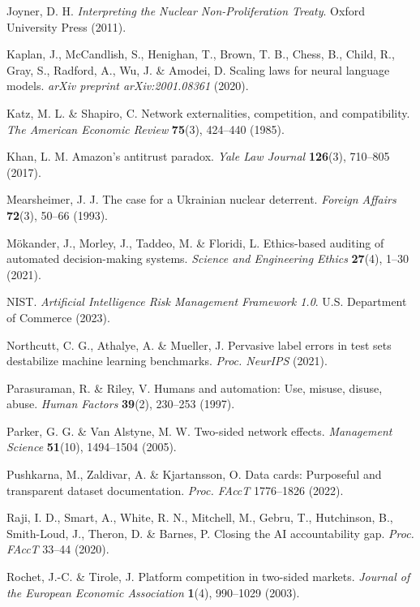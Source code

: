 \documentclass[12pt,a4paper]{article}
\theoremstyle{definition}
\theoremstyle{remark}
\begin{document}
 Joyner, D. H. \textit{Interpreting the Nuclear Non-Proliferation Treaty}. Oxford University Press (2011).

 Kaplan, J., McCandlish, S., Henighan, T., Brown, T. B., Chess, B., Child, R., Gray, S., Radford, A., Wu, J. \& Amodei, D. Scaling laws for neural language models. \textit{arXiv preprint arXiv:2001.08361} (2020).

 Katz, M. L. \& Shapiro, C. Network externalities, competition, and compatibility. \textit{The American Economic Review} \textbf{75}(3), 424--440 (1985).

 Khan, L. M. Amazon's antitrust paradox. \textit{Yale Law Journal} \textbf{126}(3), 710--805 (2017).

 Mearsheimer, J. J. The case for a Ukrainian nuclear deterrent. \textit{Foreign Affairs} \textbf{72}(3), 50--66 (1993).

 M\"{o}kander, J., Morley, J., Taddeo, M. \& Floridi, L. Ethics-based auditing of automated decision-making systems. \textit{Science and Engineering Ethics} \textbf{27}(4), 1--30 (2021).

 NIST. \textit{Artificial Intelligence Risk Management Framework 1.0}. U.S. Department of Commerce (2023).

 Northcutt, C. G., Athalye, A. \& Mueller, J. Pervasive label errors in test sets destabilize machine learning benchmarks. \textit{Proc. NeurIPS} (2021).

 Parasuraman, R. \& Riley, V. Humans and automation: Use, misuse, disuse, abuse. \textit{Human Factors} \textbf{39}(2), 230--253 (1997).

 Parker, G. G. \& Van Alstyne, M. W. Two-sided network effects. \textit{Management Science} \textbf{51}(10), 1494--1504 (2005).

 Pushkarna, M., Zaldivar, A. \& Kjartansson, O. Data cards: Purposeful and transparent dataset documentation. \textit{Proc. FAccT} 1776--1826 (2022).

 Raji, I. D., Smart, A., White, R. N., Mitchell, M., Gebru, T., Hutchinson, B., Smith-Loud, J., Theron, D. \& Barnes, P. Closing the AI accountability gap. \textit{Proc. FAccT} 33--44 (2020).

 Rochet, J.-C. \& Tirole, J. Platform competition in two-sided markets. \textit{Journal of the European Economic Association} \textbf{1}(4), 990--1029 (2003).
\end{document}
